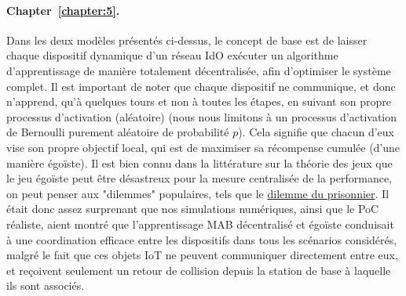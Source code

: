 \begin{resume_fr}
\paragraph{Chapter~\ref{chapter:5}.}
%
Dans les deux modèles présentés ci-dessus, le concept de base est de laisser chaque dispositif dynamique d'un réseau IdO exécuter un algorithme d'apprentissage de manière totalement décentralisée, afin d'optimiser le système complet.
Il est important de noter que chaque dispositif ne communique, et donc n'apprend, qu'à quelques tours et non à toutes les étapes, en suivant son propre processus d'activation (aléatoire) (nous nous limitons à un processus d'activation de Bernoulli purement aléatoire de probabilité $p$).
Cela signifie que chacun d'eux vise son propre objectif local, qui est de maximiser sa récompense cumulée (d'une manière égoïste).
Il est bien connu dans la littérature sur la théorie des jeux que le jeu égoïste peut être désastreux pour la mesure centralisée de la performance, on peut penser aux "dilemmes" populaires, tels que le \href{https://fr.wikipedia.org/wiki/Dilemme_du_prisonnier}{dilemme du prisonnier}.
Il était donc assez surprenant que nos simulations numériques, ainsi que le PoC réaliste, aient montré que l'apprentissage MAB décentralisé et égoïste conduisait à une coordination efficace entre les dispositifs dans tous les scénarios considérés, malgré le fait que ces objets IoT ne peuvent communiquer directement entre eux, et reçoivent seulement un retour de collision depuis la station de base à laquelle ils sont associés.


\end{resume_fr}
